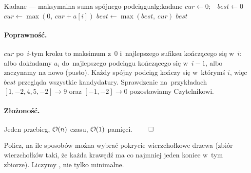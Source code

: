 \begin{alg}{Kadane --- maksymalna suma spójnego podciągu}{alg:kadane}
	\State $\mathit{cur}\gets 0$;\ \ $\mathit{best}\gets 0$
	\State $\mathit{cur}\gets\max(0,\ \mathit{cur}+a[i])$
	\State $\mathit{best}\gets\max(\mathit{best},\ \mathit{cur})$
	\EndFor
	\State \Return $\mathit{best}$
	\EndFunction
\end{alg}

\paragraph{Poprawność.}
$\mathit{cur}$ po~$i$-tym kroku to maksimum z~$0$ i~najlepszego sufiksu
kończącego się w~$i$: albo dokładamy $a_i$ do~najlepszego podciągu kończącego
się w~$i{-}1$, albo zaczynamy na nowo (pusto). Każdy spójny podciąg kończy się
w~którymś $i$, więc $\mathit{best}$ przegląda wszystkie kandydatury. Sprawdzenie
na~przykładach $[1,-2,4,5,-2]\to 9$ oraz $[-1,-2]\to 0$ pozostawiamy
Czytelnikowi.

\paragraph{Złożoność.}
Jeden przebieg, $\mathcal{O}(n)$ czasu, $\mathcal{O}(1)$ pamięci. $\qed$

\clearpage
\begin{zadanie}
	Policz, na ile sposobów można wybrać pokrycie wierzchołkowe drzewa (zbiór
	wierzchołków taki, że każda krawędź ma co najmniej jeden koniec w~tym
	zbiorze). Liczymy , nie tylko minimalne.
\end{zadanie}

